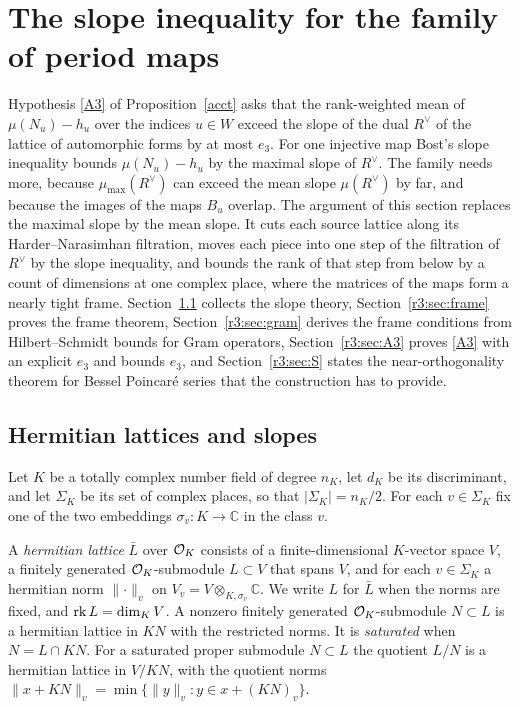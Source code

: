 

\section{The slope inequality for the family of period maps}\label{r3:sec}

Hypothesis \eqref{A3} of Proposition~\ref{acct} asks that the rank-weighted mean of $\mu(N_u)-h_u$ over the indices $u\in W$ exceed the slope of the dual $R^\vee$ of the lattice of automorphic forms by at most $e_3$. For one injective map Bost's slope inequality bounds $\mu(N_u)-h_u$ by the maximal slope of $R^\vee$. The family needs more, because $\mu_{\max}(R^\vee)$ can exceed the mean slope $\mu(R^\vee)$ by far, and because the images of the maps $B_u$ overlap. The argument of this section replaces the maximal slope by the mean slope. It cuts each source lattice along its Harder--Narasimhan filtration, moves each piece into one step of the filtration of $R^\vee$ by the slope inequality, and bounds the rank of that step from below by a count of dimensions at one complex place, where the matrices of the maps form a nearly tight frame. Section~\ref{r3:sec:slopes} collects the slope theory, Section~\ref{r3:sec:frame} proves the frame theorem, Section~\ref{r3:sec:gram} derives the frame conditions from Hilbert--Schmidt bounds for Gram operators, Section~\ref{r3:sec:A3} proves \eqref{A3} with an explicit $e_3$ and bounds $e_3$, and Section~\ref{r3:sec:S} states the near-orthogonality theorem for Bessel Poincar\'e series that the construction has to provide.

\subsection{Hermitian lattices and slopes}\label{r3:sec:slopes}

Let $K$ be a totally complex number field of degree $n_K$, let $d_K$ be its discriminant, and let $\Sigma_K$ be its set of complex places, so that $\lvert\Sigma_K\rvert=n_K/2$. For each $v\in\Sigma_K$ fix one of the two embeddings $\sigma_v\colon K\to\mathbb C$ in the class $v$.

A \emph{hermitian lattice} $\bar L$ over $\mathcal O_K$ consists of a finite-dimensional $K$-vector space $V$, a finitely generated $\mathcal O_K$-submodule $L\subset V$ that spans $V$, and for each $v\in\Sigma_K$ a hermitian norm $\lVert\cdot\rVert_v$ on $V_v=V\otimes_{K,\sigma_v}\mathbb C$. We write $L$ for $\bar L$ when the norms are fixed, and $\operatorname{rk} L=\dim_KV$. A nonzero finitely generated $\mathcal O_K$-submodule $N\subset L$ is a hermitian lattice in $KN$ with the restricted norms. It is \emph{saturated} when $N=L\cap KN$. For a saturated proper submodule $N\subset L$ the quotient $L/N$ is a hermitian lattice in $V/KN$, with the quotient norms $\lVert x+KN\rVert_v=\min\{\lVert y\rVert_v:y\in x+(KN)_v\}$.


